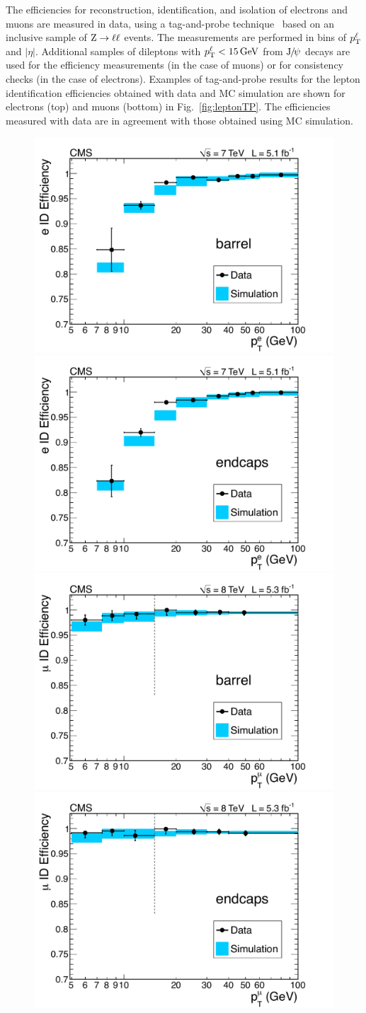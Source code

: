 \documentclass[11pt,twoside,a4paper,cmspaper,final,collab]{cms-tdr}
\begin{document}
The efficiencies for reconstruction, identification, and isolation of electrons and muons
are measured in data, using a tag-and-probe technique~\cite{CMS:2011aa} based
on an inclusive sample of $\mathrm{Z} \to \ell\ell $ events.
The measurements are performed in bins of $p_{\mathrm{T}}^{\ell} $ and $ |\eta| $.
Additional samples of dileptons with $p_{\mathrm{T}}^{\ell} < 15\,\text{Ge\hspace{-.08em}V}$ from $\mathrm{J}\hspace{-.08em}/\hspace{-.14em}\psi$ decays are used
for the efficiency measurements (in the case of muons)
or for consistency checks (in the case of electrons).
Examples of tag-and-probe results for the lepton identification efficiencies
obtained with data and MC simulation
are shown for electrons (top) and muons (bottom) in Fig.~\ref{fig:leptonTP}.
The efficiencies measured with
data are in agreement with those obtained using MC simulation.
\begin{figure}[htbp]
   \begin{center}
     \includegraphics[width=0.49\linewidth]{figures/HZZ_Eff_ElectronBarrel.pdf}
     \includegraphics[width=0.49\linewidth]{figures/HZZ_Eff_ElectronEndcap.pdf}
     \includegraphics[width=0.49\linewidth]{figures/HZZ_Eff_MuonBarrel.pdf}
     \includegraphics[width=0.49\linewidth]{figures/HZZ_Eff_MuonEndcap.pdf}

\end{center}
\end{figure}
\end{document}

